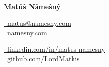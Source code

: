 \documentclass[a4paper,12pt]{article}
\begin{document}
\begin{center}
{\Huge\bfseries\filcenter Matúš Námešný}
\end{center}

\begin{center}
\begin{minipage}{0.45\textwidth}
  \begin{flushleft}
    \href{mailto:matus@namesny.com}{\faEnvelope\ matus@namesny.com} \\[4pt]
    \href{https://namesny.com}{\faGlobe\ namesny.com}
  \end{flushleft}
\end{minipage}
\hfill
\begin{minipage}{0.45\textwidth}
  \begin{flushleft}
    \href{https://www.linkedin.com/in/matus-namesny/}{\faLinkedin\ linkedin.com/in/matus-namesny} \\[4pt]
    \href{https://www.github.com/LordMathis}{\faGithub\ github.com/LordMathis}
  \end{flushleft}
\end{minipage}
\end{center}
\end{document}
